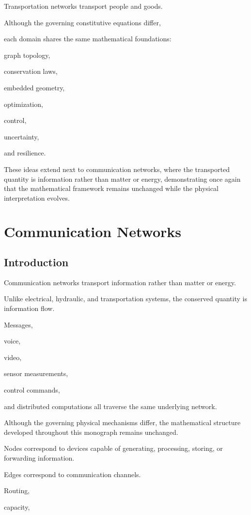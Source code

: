 \documentclass[11pt,fleqn]{book}
\numberwithin{equation}{chapter}
\theoremstyle{plain}
\theoremstyle{definition}
\theoremstyle{remark}
\begin{document}
Transportation networks transport people and goods.

Although the governing constitutive equations differ,

each domain shares the same mathematical foundations:

graph topology,

conservation laws,

embedded geometry,

optimization,

control,

uncertainty,

and resilience.

These ideas extend next to communication
networks, where the transported quantity is information rather than
matter or energy, demonstrating once again that the mathematical
framework remains unchanged while the physical interpretation evolves.

\chapter{Communication Networks}

\section{Introduction}

Communication networks transport information rather than matter or
energy.

Unlike electrical, hydraulic, and transportation systems, the conserved
quantity is information flow.

Messages,

voice,

video,

sensor measurements,

control commands,

and distributed computations all traverse the same underlying network.

Although the governing physical mechanisms differ, the mathematical
structure developed throughout this monograph remains unchanged.

Nodes correspond to devices capable of generating, processing, storing,
or forwarding information.

Edges correspond to communication channels.

Routing,

capacity,
\end{document}
